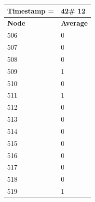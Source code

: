 \begin{tabular}{|l||l|}
\hline
\textbf{Timestamp =} & \textbf{42}\# 12\\\hline
	\textbf{Node} & \textbf{Average} \\ \hline
\hline
	506 & 0 \\ \hline
	507 & 0 \\ \hline
	508 & 0 \\ \hline
	509 & 1 \\ \hline
	510 & 0 \\ \hline
	511 & 1 \\ \hline
	512 & 0 \\ \hline
	513 & 0 \\ \hline
	514 & 0 \\ \hline
	515 & 0 \\ \hline
	516 & 0 \\ \hline
	517 & 0 \\ \hline
	518 & 0 \\ \hline
	519 & 1 \\ \hline
\end{tabular}

